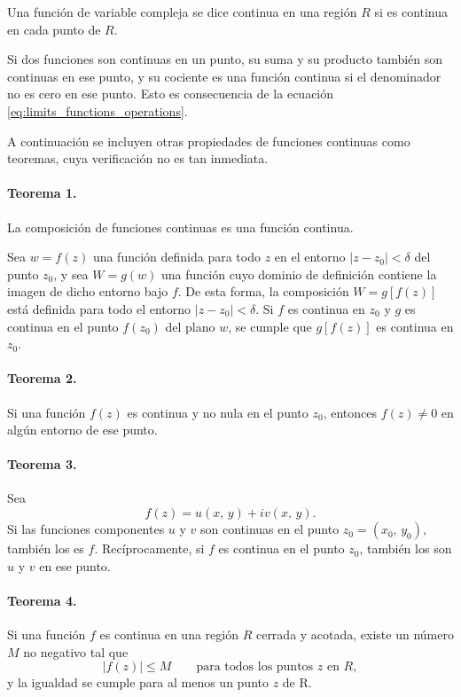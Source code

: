 \documentclass[a4paper]{report}
\begin{document}
Una función de variable compleja se dice continua en una región \(R\) si es continua en cada punto de \(R\).

Si dos funciones son continuas en un punto, su suma y su producto también son continuas en ese punto, y su cociente es una función continua si el denominador no es cero en ese punto. Esto es consecuencia de la ecuación \ref{eq:limits_functions_operations}.

A continuación se incluyen otras propiedades de funciones continuas como teoremas, cuya verificación no es tan inmediata.

\paragraph{Teorema 1.} La composición de funciones continuas es una función continua. 

Sea \(w=f(z)\) una función definida para todo \(z\) en el entorno \(|z-z_0|<\delta\) del punto \(z_0\), y sea \(W=g(w)\) una función cuyo dominio de definición contiene la imagen de dicho entorno bajo \(f\). De esta forma, la composición \(W=g[f(z)]\) está definida para todo el entorno \(|z-z_0|<\delta\). Si \(f\) es continua en \(z_0\) y \(g\) es continua en el punto \(f(z_0)\) del plano \(w\), se cumple que \(g[f(z)]\) es continua en \(z_0\).

\paragraph{Teorema 2.} Si una función \(f(z)\) es continua y no nula en el punto \(z_0\), entonces \(f(z)\neq0\) en algún entorno de ese punto.

\paragraph{Teorema 3.} Sea
\[
 f(z)=u(x,\,y)+iv(x,\,y).
\]
Si las funciones componentes \(u\) y \(v\) son continuas en el punto \(z_0=(x_0,\,y_0)\), también los es \(f\). Recíprocamente, si \(f\) es continua en el punto \(z_0\), también los son \(u\) y \(v\) en ese punto.

\paragraph{Teorema 4.} Si una función \(f\) es continua en una región \(R\) cerrada y acotada, existe un número \(M\) no negativo tal que 
\[
 |f(z)|\leq M\qquad\textrm{para todos los puntos }z\textrm{ en }R,
\]
y la igualdad se cumple para al menos un punto \(z\) de R.
\end{document}
